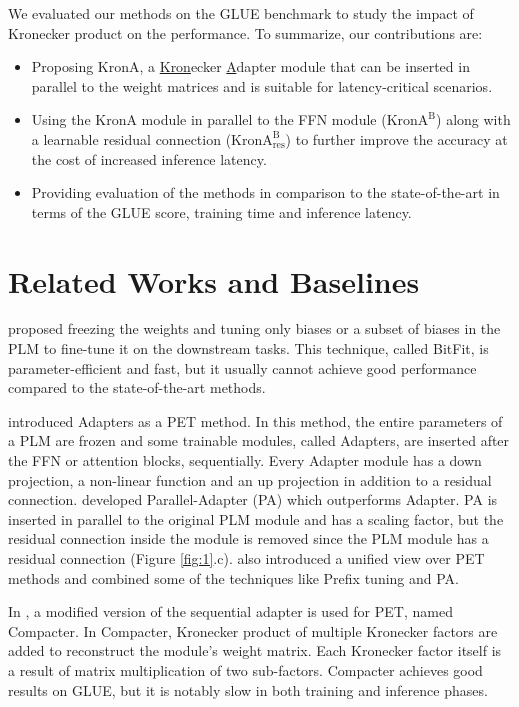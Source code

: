We evaluated our methods on the GLUE benchmark \cite{wang-etal-2018-glue} to study the impact of Kronecker product on the performance. To summarize, our contributions are:

\begin{itemize}
    \item Proposing KronA, a \underline{Kron}ecker \underline{A}dapter module that can be inserted in parallel to the weight matrices and is suitable for latency-critical scenarios.
    \item Using the KronA module in parallel to the FFN module ($\text{KronA}^\text{B}$) along with a learnable residual connection ($\text{KronA}^\text{B}_\text{res}$) to further improve the accuracy at the cost of increased inference latency.
    \item Providing evaluation of the methods in comparison to the state-of-the-art in terms of the GLUE score, training time and inference latency.
\end{itemize}

\section{Related Works and Baselines} \citep{zaken2021bitfit} proposed freezing the weights and tuning only biases or a subset of biases in the PLM to fine-tune it on the downstream tasks. This technique, called BitFit, is parameter-efficient and fast, but it usually cannot achieve good performance compared to the state-of-the-art methods.

\cite{pmlr-v97-houlsby19a} introduced Adapters as a PET method. In this method, the entire parameters of a PLM are frozen and some trainable modules, called Adapters, are inserted after the FFN or attention blocks, sequentially. Every Adapter module has a down projection, a non-linear function and an up projection in addition to a residual connection. \cite{he2022towards} developed Parallel-Adapter (PA) which outperforms Adapter. PA is inserted in parallel to the original PLM module and has a scaling factor, but the residual connection inside the module is removed since the PLM module has a residual connection (Figure \ref{fig:1}.c). \cite{he2022towards} also introduced a unified view over PET methods and combined some of the techniques like Prefix tuning \cite{li-liang-2021-prefix} and PA.

In \cite{karimi2021compacter}, a modified version of the sequential adapter is used for PET, named Compacter. In Compacter, Kronecker product of multiple Kronecker factors are added to reconstruct the module's weight matrix. Each Kronecker factor itself is a result of matrix multiplication of two sub-factors. Compacter achieves good results on GLUE, but it is notably slow in both training and inference phases.

